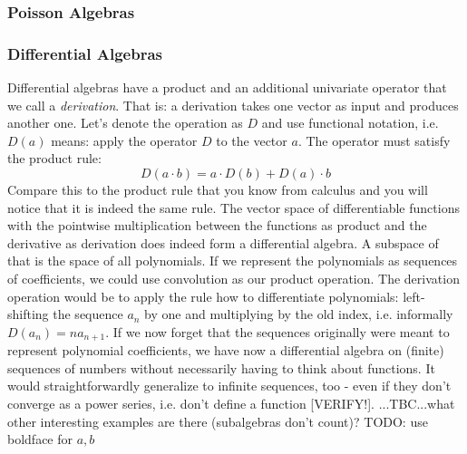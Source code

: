 

\subsubsection{Poisson Algebras} 


\subsubsection{Differential Algebras} 
Differential algebras have a product and an additional univariate operator that we call a \emph{derivation}. That is: a derivation takes one vector as input and produces another one. Let's denote the operation as $D$ and use functional notation, i.e. $D(a)$ means: apply the operator $D$ to the vector $a$. The operator must satisfy the product rule:
\begin{equation}
 D(a \cdot b) = a \cdot D(b) + D(a) \cdot b
\end{equation}
Compare this to the product rule that you know from calculus and you will notice that it is indeed the same rule. The vector space of differentiable functions with the pointwise multiplication between the functions as product and the derivative as derivation does indeed form a differential algebra. A subspace of that is the space of all polynomials. If we represent the polynomials as sequences of coefficients, we could use convolution as our product operation. The derivation operation would be to apply the rule how to differentiate polynomials: left-shifting the sequence $a_n$ by one and multiplying by the old index, i.e. informally $D(a_n) = n a_{n+1}$. If we now forget that the sequences originally were meant to represent polynomial coefficients, we have now a differential algebra on (finite) sequences of numbers without necessarily having to think about functions. It would straightforwardly generalize to infinite sequences, too - even if they don't converge as a power series, i.e. don't define a function [VERIFY!]. ...TBC...what other interesting examples are there (subalgebras don't count)? TODO: use boldface for $a,b$


